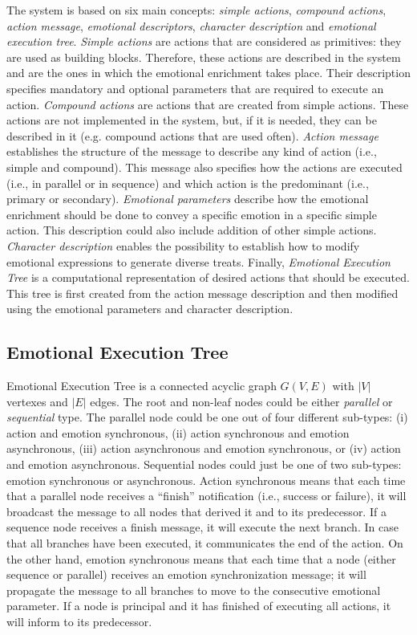 \documentclass{sig-alternate-05-2015}
\begin{document}
The system is based on six main concepts: \textit{simple actions}, \textit{compound actions}, \textit{action message}, \textit{emotional descriptors}, \textit{character description} and \textit{emotional execution tree}. \textit{Simple actions} are actions that are considered as primitives: they are used as building blocks. Therefore, these actions are described in the system and are the ones in which the emotional enrichment takes place. Their description specifies mandatory and optional parameters that are required to execute an action. \textit{Compound actions} are actions that are created from simple actions. These actions are not implemented in the system, but, if it is needed, they can be described in it (e.g. compound actions that are used often). \textit{Action message} establishes the structure of the message to describe any kind of action (i.e., simple and compound). This message also specifies how the actions are executed (i.e., in parallel or in sequence) and which action is the predominant (i.e., primary or secondary). \textit{Emotional parameters} describe how the emotional enrichment should be done to convey a specific emotion in a specific simple action. This description could also include addition of other simple actions. \textit{Character description} enables the possibility to establish how to modify emotional expressions to generate diverse treats. Finally, \textit{Emotional Execution Tree} is a computational representation of desired actions that should be executed. This tree is first created from the action message description and then modified using the emotional parameters and character description.   

\subsection{Emotional Execution Tree}

Emotional Execution Tree is a connected acyclic graph $G(V,E)$ with $|V|$ vertexes and $|E|$ edges. The root and non-leaf nodes could be either \textit{parallel} or \textit{sequential} type. The parallel node could be one out of four different sub-types: (i) action and emotion synchronous, (ii) action synchronous and emotion asynchronous, (iii) action asynchronous and emotion synchronous, or (iv) action and emotion asynchronous. Sequential nodes could just be one of two sub-types: emotion synchronous or asynchronous. Action synchronous means that each time that a parallel node receives a ``finish'' notification (i.e., success or failure), it will broadcast the message to all nodes that derived it and to its predecessor. If a sequence node receives a finish message, it will execute the next branch. In case that all branches have been executed, it communicates the end of the action. On the other hand, emotion synchronous means that each time that a node (either sequence or parallel) receives an emotion synchronization message; it will propagate the message to all branches to move to the consecutive emotional parameter. If a node is principal and it has finished of executing all actions, it will inform to its predecessor. 
 
\end{document}

